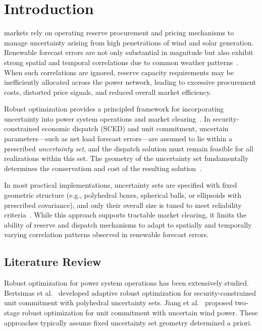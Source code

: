 \documentclass[lettersize,journal]{IEEEtran}
\theoremstyle{definition}
\begin{document}
\section{Introduction}
\label{sec:introduction}

 markets rely on operating reserve procurement and pricing mechanisms to manage uncertainty arising from high penetrations of wind and solar generation. Renewable forecast errors are not only substantial in magnitude but also exhibit strong spatial and temporal correlations due to common weather patterns~\cite{Hodge2011,Pinson2013}. When such correlations are ignored, reserve capacity requirements may be inefficiently allocated across the power network, leading to excessive procurement costs, distorted price signals, and reduced overall market efficiency.

Robust optimization provides a principled framework for incorporating uncertainty into power system operations and market clearing~\cite{BenTal2009,Bertsimas2011}. In security-constrained economic dispatch (SCED) and unit commitment, uncertain parameters---such as net load forecast errors---are assumed to lie within a prescribed \emph{uncertainty set}, and the dispatch solution must remain feasible for all realizations within this set. The geometry of the uncertainty set fundamentally determines the conservatism and cost of the resulting solution~\cite{Bertsimas2013}.

In most practical implementations, uncertainty sets are specified with fixed geometric structure (e.g., polyhedral boxes, spherical balls, or ellipsoids with prescribed covariance), and only their overall size is tuned to meet reliability criteria~\cite{Jiang2012,Zeng2013}. While this approach supports tractable market clearing, it limits the ability of reserve and dispatch mechanisms to adapt to spatially and temporally varying correlation patterns observed in renewable forecast errors.

\subsection{Literature Review}

Robust optimization for power system operations has been extensively studied. Bertsimas et al.~\cite{Bertsimas2013} developed adaptive robust optimization for security-constrained unit commitment with polyhedral uncertainty sets. Jiang et al.~\cite{Jiang2012} proposed two-stage robust optimization for unit commitment with uncertain wind power. These approaches typically assume fixed uncertainty set geometry determined a priori.
\end{document}
